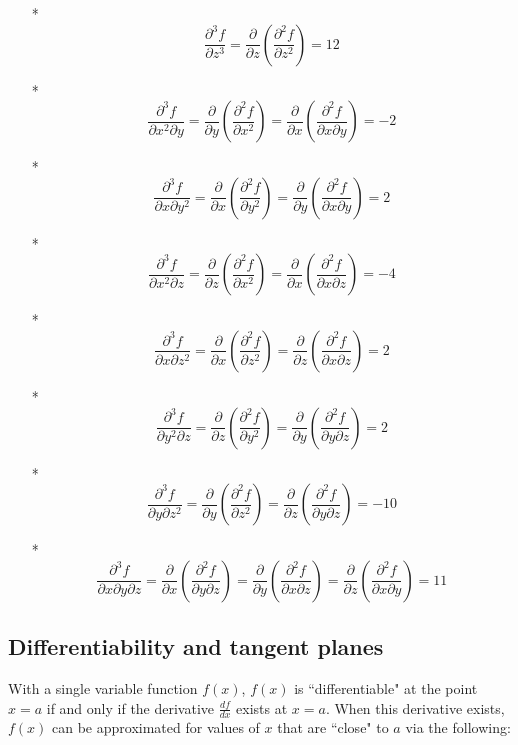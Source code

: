 \documentclass{article}
\begin{document}
\begin{itemize}
\begin{itemize}
\item[*]
\[\frac{\partial^3 f}{\partial z^3} = \frac{\partial}{\partial z}\left(\frac{\partial^2 f}{\partial z^2}\right) = 12\]
\item[*]
\[\frac{\partial^3 f}{\partial x^2 \partial y} = \frac{\partial}{\partial y}\left(\frac{\partial^2 f}{\partial x^2}\right) = \frac{\partial}{\partial x}\left(\frac{\partial^2 f}{\partial x \partial y}\right) = -2\]
\item[*] 
\[\frac{\partial^3 f}{\partial x \partial y^2} = \frac{\partial}{\partial x}\left(\frac{\partial^2 f}{\partial y^2}\right) = \frac{\partial}{\partial y}\left(\frac{\partial^2 f}{\partial x \partial y}\right) = 2\]
\item[*]
\[\frac{\partial^3 f}{\partial x^2 \partial z} = \frac{\partial}{\partial z}\left(\frac{\partial^2 f}{\partial x^2}\right) = \frac{\partial}{\partial x}\left(\frac{\partial^2 f}{\partial x \partial z}\right) = -4\]
\item[*] 
\[\frac{\partial^3 f}{\partial x \partial z^2} = \frac{\partial}{\partial x}\left(\frac{\partial^2 f}{\partial z^2}\right) = \frac{\partial}{\partial z}\left(\frac{\partial^2 f}{\partial x \partial z}\right) = 2\]
\item[*]
\[\frac{\partial^3 f}{\partial y^2 \partial z} = \frac{\partial}{\partial z}\left(\frac{\partial^2 f}{\partial y^2}\right) = \frac{\partial}{\partial y}\left(\frac{\partial^2 f}{\partial y \partial z}\right) = 2\]
\item[*] 
\[\frac{\partial^3 f}{\partial y \partial z^2} = \frac{\partial}{\partial y}\left(\frac{\partial^2 f}{\partial z^2}\right) = \frac{\partial}{\partial z}\left(\frac{\partial^2 f}{\partial y \partial z}\right) = -10\]
\item[*]
\[\frac{\partial^3 f}{\partial x \partial y \partial z} = \frac{\partial}{\partial x}\left(\frac{\partial^2 f}{\partial y \partial z}\right) = \frac{\partial}{\partial y}\left(\frac{\partial^2 f}{\partial x \partial z}\right) = \frac{\partial}{\partial z}\left(\frac{\partial^2 f}{\partial x \partial y}\right) = 11\]
\end{itemize}
\end{itemize}




\subsection*{Differentiability and tangent planes} 

With a single variable function \(f(x)\), \(f(x)\) is ``differentiable" at the point \(x = a\) if and only if the derivative \(\frac{df}{dx}\) exists at \(x = a\). When this derivative exists, \(f(x)\) can be approximated for values of \(x\) that are ``close" to \(a\) via the following: 
\end{document}

